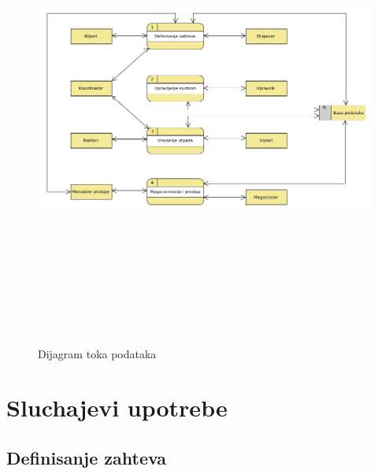 \documentclass[10 pt]{article}
\begin{document}
	\begin{figure}[H]
		\centering
		\includegraphics[width=15cm,height=15cm,keepaspectratio]{slike/DTP.png}\\
		\caption{Dijagram toka podataka}
		\label{fig:dijagramTokaPodataka}
	\end{figure}
	
	
	
	\section{Sluchajevi upotrebe}
	
	\subsection{Definisanje zahteva}
	
\end{document}
